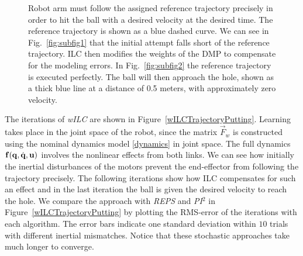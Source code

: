 \begin{figure}[ht]
\centering
{}
\caption{Robot arm must follow the assigned reference trajectory precisely in order to hit the ball with a desired velocity at the desired time. The reference trajectory is shown as a blue dashed curve. We can see in Fig.~\ref{fig:subfig1} that the initial attempt falls short of the reference trajectory. ILC then modifies the weights of the DMP to compensate for the modeling errors. In Fig.~\ref{fig:subfig2} the reference trajectory is executed perfectly. The ball will then approach the hole, shown as a thick blue line at a distance of 0.5 meters, with approximately zero velocity.} 
\label{putting1} 
\end{figure}

The iterations of \emph{wILC} are shown in Figure~\ref{wILCTrajectoryPutting}. Learning takes place in the joint space of the robot, since the matrix $\vec{F}_{w}$ is constructed using the nominal dynamics model \eqref{dynamics} in joint space. The full dynamics $\boldsymbol{\mathrm{f}}(\boldsymbol{\mathrm{q}},\dot{\boldsymbol{\mathrm{q}}},\boldsymbol{\mathrm{u}})$ involves the nonlinear effects from both links. We can see how initially the inertial disturbances of the motors prevent the end-effector from following the trajectory precisely. The following iterations show how ILC compensates for such an effect and in the last iteration the ball is given the desired velocity to reach the hole. We compare the approach with \emph{REPS} and \emph{PI$^{2}$} in Figure~\ref{wILCTrajectoryPutting} by plotting the RMS-error of the iterations with each algorithm. The error bars indicate one standard deviation within $10$ trials with different inertial mismatches. Notice that these stochastic approaches take much longer to converge.

